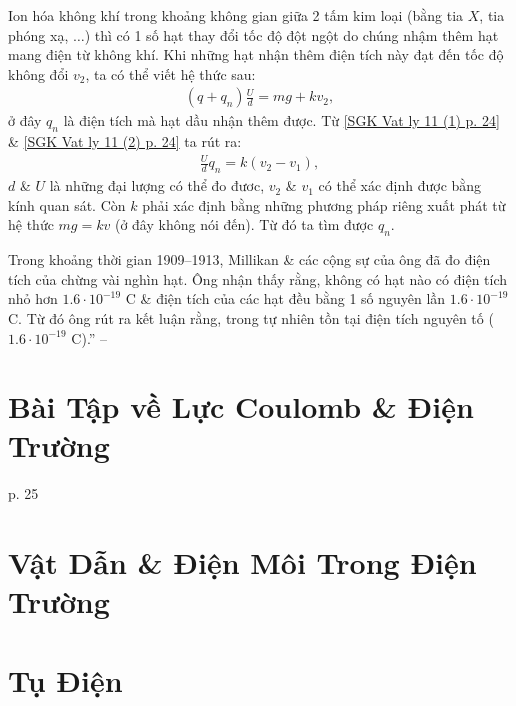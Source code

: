 \documentclass[oneside]{book}
\numberwithin{equation}{section}
\begin{document}
Ion hóa không khí trong khoảng không gian giữa 2 tấm kim loại (bằng tia $X$, tia phóng xạ, $\ldots$) thì có 1 số hạt thay đổi tốc độ đột ngột do chúng nhậm thêm hạt mang điện từ không khí. Khi những hạt nhận thêm điện tích này đạt đến tốc độ không đổi $v_2$, ta có thể viết hệ thức sau:
\begin{align}
	\label{SGK Vat ly 11 (2) p. 24}
	(q + q_n)\frac{U}{d} = mg + kv_2,
\end{align}
ở đây $q_n$ là điện tích mà hạt dầu nhận thêm được. Từ \eqref{SGK Vat ly 11 (1) p. 24} \& \eqref{SGK Vat ly 11 (2) p. 24} ta rút ra:
\begin{align*}
	\frac{U}{d}q_n = k(v_2 - v_1),
\end{align*}
$d$ \& $U$ là những đại lượng có thể đo đươc, $v_2$ \& $v_1$ có thể xác định được bằng kính quan sát. Còn $k$ phải xác định bằng những phương pháp riêng xuất phát từ hệ thức $mg = kv$ (ở đây không nói đến). Từ đó ta tìm được $q_n$.

Trong khoảng thời gian 1909--1913, Millikan \& các cộng sự của ông đã đo điện tích của chừng vài nghìn hạt. Ông nhận thấy rằng, không có hạt nào có điện tích nhỏ hơn $1.6\cdot 10^{-19}$ C \& điện tích của các hạt đều bằng 1 số nguyên lần $1.6\cdot 10^{-19}$ C. Từ đó ông rút ra kết luận rằng, trong tự nhiên tồn tại điện tích nguyên tố ($1.6\cdot 10^{-19}$ C).'' -- \cite[pp. 23--24]{SGK_Vat_Ly_11_nang_cao}


\section{Bài Tập về Lực Coulomb \& Điện Trường}
p. 25


\section{Vật Dẫn \& Điện Môi Trong Điện Trường}


\section{Tụ Điện}

\end{document}
